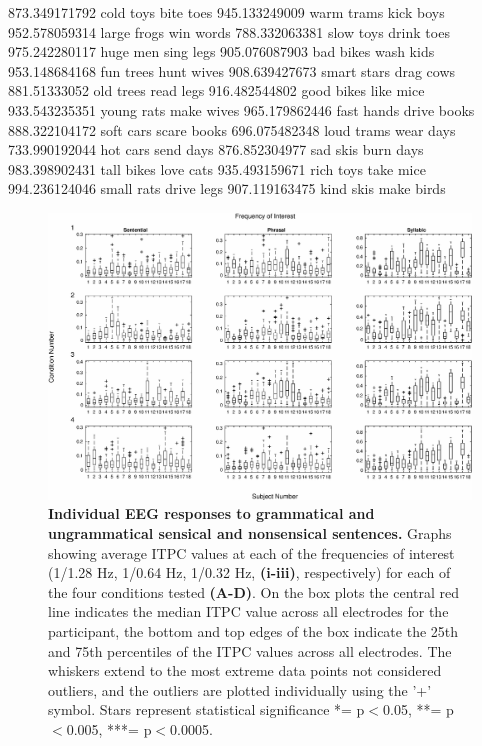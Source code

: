 \documentclass[a4paper,10pt,twoside]{article}
\begin{document}
873.349171792	cold toys bite toes
945.133249009	warm trams kick boys
952.578059314	large frogs win words 
788.332063381	slow toys drink toes 
975.242280117	huge men sing legs 
905.076087903	bad bikes wash kids
953.148684168	fun trees hunt wives 
908.639427673	smart stars drag cows
881.51333052	old trees read legs 
916.482544802	good bikes like mice
933.543235351	young rats make wives
965.179862446	fast hands drive books 
888.322104172	soft cars scare books 
696.075482348	loud trams wear days 
733.990192044	hot cars send days 
876.852304977	sad skis burn days 
983.398902431	tall bikes love cats
935.493159671	rich toys take mice
994.236124046	small rats drive legs 
907.119163475	kind skis make birds 




\begin{figure}[tbhp]
\includegraphics[width=\linewidth]{BoxPlots_per_subject.eps}
\caption{\textbf{Individual EEG responses to grammatical and ungrammatical sensical and nonsensical sentences.} Graphs showing average ITPC values at each of the frequencies of interest (1/1.28 Hz, 1/0.64 Hz, 1/0.32 Hz, \textbf{(i-iii)}, respectively) for each of the four conditions tested \textbf{(A-D)}. On the box plots the central red line indicates the median ITPC value across all electrodes for the participant, the bottom and top edges of the box indicate the 25th and 75th percentiles of the ITPC values across all electrodes. The whiskers extend to the most extreme data points not considered outliers, and the outliers are plotted individually using the '+' symbol. Stars represent statistical significance *= p$<$0.05, **= p$<$0.005, ***= p$<$0.0005.}
\label{Fig2}
\end{figure}
\end{document}
